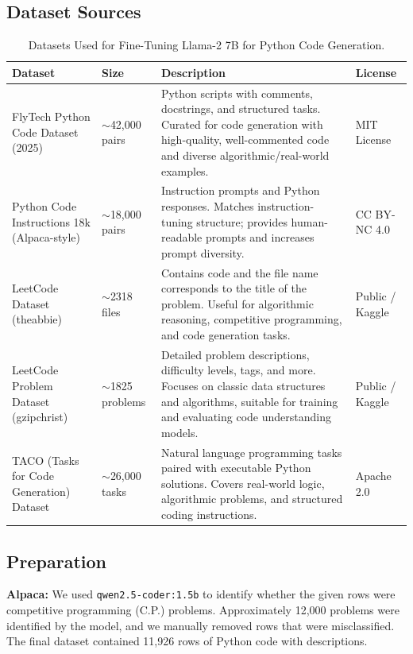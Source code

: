 \subsection{Dataset Sources}
\begin{table}[h!]
\centering
\begin{tabular}{|p{5cm}|p{2cm}|p{6cm}|p{2cm}|}
\hline
\textbf{Dataset} & \textbf{Size} & \textbf{Description} & \textbf{License} \\
\hline
FlyTech Python Code Dataset (2025) & $\sim$42,000 pairs & Python scripts with comments, docstrings, and structured tasks. Curated for code generation with high-quality, well-commented code and diverse algorithmic/real-world examples. & MIT License \\
\hline
Python Code Instructions 18k (Alpaca-style) & $\sim$18,000 pairs & Instruction prompts and Python responses. Matches instruction-tuning structure; provides human-readable prompts and increases prompt diversity. & CC BY-NC 4.0 \\
\hline
LeetCode Dataset (theabbie) & $\sim$2318 files & Contains code and the file name corresponds to the title of the problem. Useful for algorithmic reasoning, competitive programming, and code generation tasks. & Public / Kaggle \\
\hline
LeetCode Problem Dataset (gzipchrist) & $\sim$1825 problems & Detailed problem descriptions, difficulty levels, tags, and more. Focuses on classic data structures and algorithms, suitable for training and evaluating code understanding models. & Public / Kaggle \\
\hline
TACO (Tasks for Code Generation) Dataset & $\sim$26,000 tasks & Natural language programming tasks paired with executable Python solutions. Covers real-world logic, algorithmic problems, and structured coding instructions. & Apache 2.0 \\
\hline
\end{tabular}
\caption{Datasets Used for Fine-Tuning Llama-2 7B for Python Code Generation.}
\end{table}

\subsection{Preparation}
\textbf{Alpaca:} We used \texttt{qwen2.5-coder:1.5b} to identify whether the given rows were competitive programming (C.P.) problems. Approximately 12,000 problems were identified by the model, and we manually removed rows that were misclassified. The final dataset contained 11,926 rows of Python code with descriptions.  

